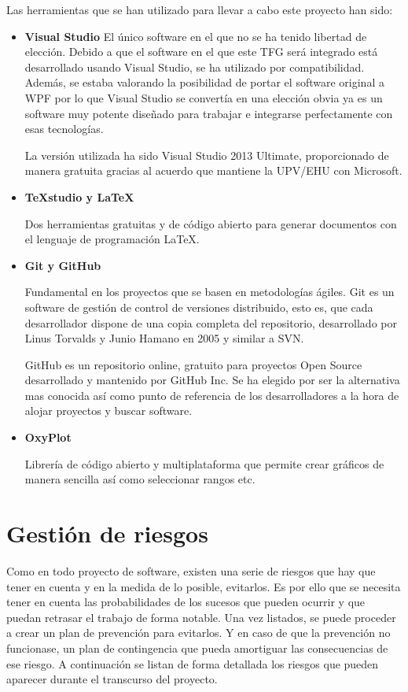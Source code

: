 Las herramientas que se han utilizado para llevar a cabo este proyecto han sido:
\begin{itemize}
    \item 
    \textbf{Visual Studio}
    El \'unico software en el que no se ha tenido libertad de elecci\'on. Debido a que el software en el que este TFG
    ser\'a integrado est\'a desarrollado usando Visual Studio, se ha utilizado por compatibilidad. Adem\'as, se estaba
    valorando la posibilidad de portar el software original a WPF por lo que Visual Studio se convert\'ia en una elecci\'on
    obvia ya es un software muy potente dise\~nado para trabajar e integrarse perfectamente con esas tecnolog\'ias.

    La versi\'on utilizada ha sido Visual Studio 2013 Ultimate, proporcionado de manera gratuita gracias al acuerdo que mantiene 
    la UPV/EHU con Microsoft.
    
    \item 
    \textbf{TeXstudio y \LaTeX}
    
    Dos herramientas gratuitas y de código abierto para generar documentos con el lenguaje de programaci\'on \LaTeX.
    
    \item
    \textbf{Git y GitHub}
    
    Fundamental en los proyectos que se basen en metodologías ágiles. Git es un software de gestión de control de versiones 
    distribuido, esto es, que cada desarrollador dispone de una copia completa del repositorio, desarrollado por Linus Torvalds y 
    Junio Hamano en 2005 y similar a SVN.
    
    GitHub es un repositorio online, gratuito para proyectos Open Source desarrollado y mantenido por GitHub Inc. Se ha elegido
    por ser la alternativa mas conocida as\'i como punto de referencia de los desarrolladores a la hora de alojar proyectos
    y buscar software.
    
    \item
    \textbf{OxyPlot}
    
    Librer\'{i}a de c\'{o}digo abierto y multiplataforma que permite crear gr\'{a}ficos de manera sencilla as\'{i} como seleccionar rangos etc.
    
\end{itemize}

\section{Gesti\'{o}n de riesgos}
Como en todo proyecto de software, existen una serie de riesgos que hay que tener en cuenta y en la medida de lo posible,
evitarlos. Es por ello que se necesita tener en cuenta las probabilidades de los sucesos que 
pueden ocurrir y que puedan retrasar el trabajo de forma notable. Una vez
listados, se puede proceder a crear un plan de prevención para evitarlos. Y en caso de que la prevenci\'on no
funcionase, un plan de contingencia que pueda amortiguar las consecuencias de ese riesgo. A continuación
se listan de forma detallada los riesgos que pueden aparecer durante el transcurso del proyecto.


